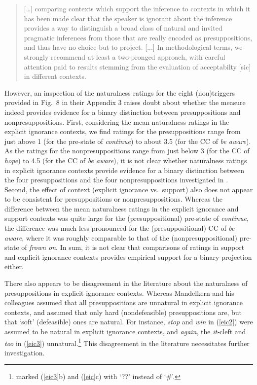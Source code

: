\documentclass[11pt,fleqn]{article}
\newcommand{\6}{\mbox{$[\hspace*{-.6mm}[$}}
\newcommand{\9}{\mbox{$]\hspace*{-.6mm}]$}}
\begin{document}
\begin{quote}

[\ldots] comparing contexts which support the inference to contexts in which it has been made clear that the speaker is ignorant about the inference provides a way to distinguish a broad class of natural and invited pragmatic inferences from those that are really encoded as presuppositions, and thus have no choice but to project. [...]  In methodological terms, we strongly recommend at least a two-pronged approach, with careful attention paid to results stemming from the evaluation of acceptabilty [sic] in different contexts.

\end{quote}

However, an inspection of the naturalness ratings for the eight (non)triggers provided in Fig.~8 in their Appendix 3 raises doubt about whether the measure indeed provides evidence for a binary distinction between presuppositions and nonpresuppositions. First, considering the mean naturalness ratings in the explicit ignorance contexts, we find ratings for the presuppositions range from just above 1 (for the pre-state of {\em continue}) to about 3.5 (for the CC of {\em be aware}). As the ratings for the nonpresuppositions range from just below 3 (for the CC of {\em hope}) to 4.5 (for the CC of {\em be aware}), it is not clear whether naturalness ratings in explicit ignorance contexts provide evidence for a binary distinction between the four presuppositions and the four nonpresuppositions investigated in \citealt{mandelkern-etal2020}. Second, the effect of context (explicit ignorance vs.\ support) also does not appear to be consistent for presuppositions or nonpresuppositions. Whereas the difference between the mean naturalness ratings in the explicit ignorance and support contexts was quite large for the (presuppositional) pre-state of {\em continue}, the difference was much less pronounced for the (presuppositional) CC of {\em be aware}, where it was roughly comparable to that of the (nonpresuppositional) pre-state of {\em frown on}. In sum, it is not clear that comparisons of ratings in support and explicit ignorance contexts provides empirical support for a binary projection either. 

There also appears to be disagreement in the literature about the naturalness of presuppositions in explicit ignorance contexts. Whereas Mandelkern and his colleagues assumed that all presuppositions are unnatural in explicit ignorance contexts, \citealt{simons01} and \citealt{abusch10} assumed that only hard (nondefeasible) presuppositions are, but that `soft' (defeasible) ones are natural. For instance,  {\em stop} and {\em win} in (\ref{eic2}) were assumed to be natural in explicit ignorance contexts, and {\em again}, the {\em it-}cleft and {\em too} in (\ref{eic3}) unnatural.\footnote{\citealt{abusch10} marked (\ref{eic3}b) and (\ref{eic}c) with `??' instead of `$\#$'.} This disagreement in the literature necessitates further investigation.
\end{document}
